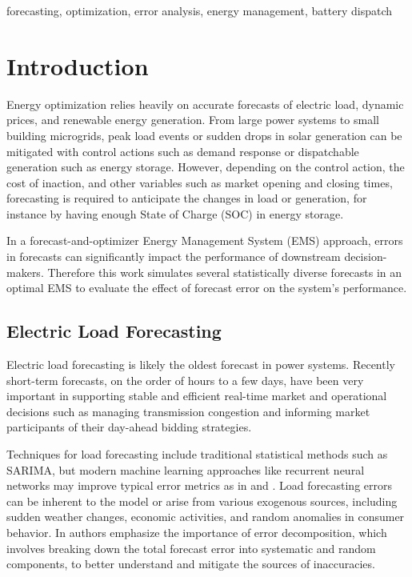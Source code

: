 \documentclass[conference]{IEEEtran}
\begin{document}
\begin{IEEEkeywords}
forecasting, optimization, error analysis, energy management, battery dispatch
\end{IEEEkeywords}

\section{Introduction}

Energy optimization relies heavily on accurate forecasts of electric load, dynamic prices, and renewable energy generation. From large power systems to small building microgrids, peak load events or sudden drops in solar generation can be mitigated with control actions such as demand response or dispatchable generation such as energy storage. However, depending on the control action, the cost of inaction, and other variables such as market opening and closing times, forecasting is required to anticipate the changes in load or generation, for instance by having enough State of Charge (SOC) in energy storage. %

In a forecast-and-optimizer Energy Management System (EMS) approach, errors in forecasts can significantly impact the performance of downstream decision-makers. Therefore this work simulates several statistically diverse forecasts in an optimal EMS to evaluate the effect of forecast error on the system's performance.

\subsection{Electric Load Forecasting}

Electric load forecasting is likely the oldest forecast in power systems. Recently short-term forecasts, on the order of hours to a few days, have been very important in supporting stable and efficient real-time market and operational decisions such as managing transmission congestion and informing market participants of their day-ahead bidding strategies. 

Techniques for load forecasting include traditional statistical methods such as SARIMA, but modern machine learning approaches like recurrent neural networks may improve typical error metrics as in \cite{wood2023day} and \cite{matrone2024electric}. Load forecasting errors can be inherent to the model or arise from various exogenous sources, including sudden weather changes, economic activities, and random anomalies in consumer behavior. In \cite{hong2016probabilistic} authors emphasize the importance of error decomposition, which involves breaking down the total forecast error into systematic and random components, to better understand and mitigate the sources of inaccuracies.
\end{document}
